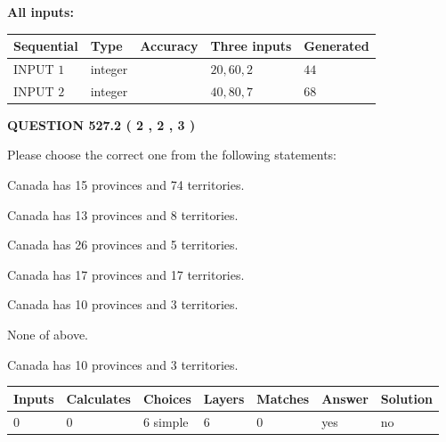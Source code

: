 \documentclass[12pt]{article}
\begin{document}
   
   
   
\noindent\vspace{0.1in}\hspace{-0.08in} {\textbf{\Large{All inputs: }}}
   
   
  
  
\noindent\begin{tabular}{|l|l|l|l|l|}
\hline
 Sequential & Type & Accuracy & Three inputs & Generated \\ 
\hline
 
 
  INPUT $  1 $ & integer &  & $
 20
 , 
 60
 , 
 2
 $ & $ 44 $ 
 \\  \hline  
 
 
  INPUT $  2 $ & integer &  & $
 40
 , 
 80
 , 
 7
 $ & $ 68 $ 
 \\  \hline  
 \end{tabular}
   
   
  
\vspace{0.2in}
  
{\textbf{\Large{QUESTION
527.2 
 ( 2 , 2 , 3 )
}}}
  
  
Please choose the correct one from the following statements:
 
 
Canada has  15 provinces and  74 territories.
 
 
Canada has  13 provinces and  8 territories.
 
 
Canada has  26 provinces and  5 territories.
 
 
Canada has  17 provinces and  17 territories.
 
 
Canada has 10  provinces and 3 territories.
 
 
 None of above.
 
 
\noindent{}
 
 
Canada has 10  provinces and 3 territories.
 
 
\noindent{}
 
 
   
   
   
   
\noindent\begin{tabular}{|l|l|l|l|l|l|l|}
 \hline
Inputs & Calculates & Choices & Layers & Matches & Answer & Solution \\ \hline
 0  & 
 0  & 
 6
  simple  
  & 
 6  & 
 0  & 
  yes & 
  no 
  \\ \hline
 \end{tabular}
   
\end{document}

